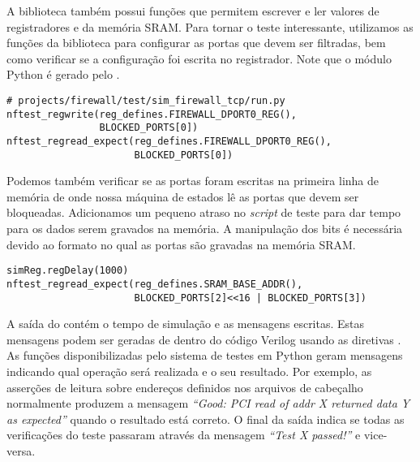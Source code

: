 A biblioteca também possui funções que permitem escrever e ler valores
de registradores e da memória SRAM.  Para tornar o teste
 interessante, utilizamos as funções da
biblioteca para configurar as portas que devem ser filtradas, bem como
verificar se a configuração foi escrita no registrador.  Note que o
módulo Python  é gerado pelo .

\begin{verbatim}
# projects/firewall/test/sim_firewall_tcp/run.py
nftest_regwrite(reg_defines.FIREWALL_DPORT0_REG(),
                BLOCKED_PORTS[0])
nftest_regread_expect(reg_defines.FIREWALL_DPORT0_REG(),
                      BLOCKED_PORTS[0])
\end{verbatim}

Podemos também verificar se as portas foram escritas na primeira linha
de memória de onde nossa máquina de estados lê as portas que devem ser
bloqueadas.  Adicionamos um pequeno atraso no \emph{script} de teste
para dar tempo para os dados serem gravados na memória.  A manipulação
dos bits é necessária devido ao formato no qual as portas são gravadas
na memória SRAM.

\begin{verbatim}
simReg.regDelay(1000)
nftest_regread_expect(reg_defines.SRAM_BASE_ADDR(),
                      BLOCKED_PORTS[2]<<16 | BLOCKED_PORTS[3])
\end{verbatim}

A saída do  contém o tempo de simulação e as mensagens
escritas.  Estas mensagens podem ser geradas de dentro do código Verilog
usando as diretivas .  As funções disponibilizadas pelo
sistema de testes em Python geram mensagens indicando qual operação será
realizada e o seu resultado. Por exemplo, as asserções de leitura sobre
endereços definidos nos arquivos de cabeçalho normalmente produzem a
mensagem \emph{``Good: PCI read of addr X returned data Y as expected''}
quando o resultado está correto. O final da saída indica se todas as
verificações do teste passaram através da mensagem \emph{``Test X
passed!''} e vice-versa.


